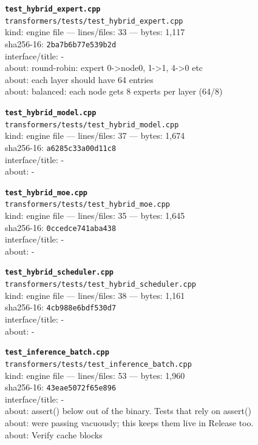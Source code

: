 \noindent\textbf{\texttt{test\_hybrid\_expert.cpp}}\\
\texttt{transformers/tests/test\_hybrid\_expert.cpp}\\
kind: engine file --- lines/files: 33 --- bytes: 1,117\\
sha256-16: \texttt{2ba7b6b77e539b2d}\\
interface/title: -\\
about: round-robin: expert 0->node0, 1->1, 4->0 etc\\
about: each layer should have 64 entries\\
about: balanced: each node gets 8 experts per layer (64/8)\\
\vspace*{6.0pt}
\newpage

\noindent\textbf{\texttt{test\_hybrid\_model.cpp}}\\
\texttt{transformers/tests/test\_hybrid\_model.cpp}\\
kind: engine file --- lines/files: 37 --- bytes: 1,674\\
sha256-16: \texttt{a6285c33a00d11c8}\\
interface/title: -\\
about: -\\
\vspace*{6.0pt}

\noindent\textbf{\texttt{test\_hybrid\_moe.cpp}}\\
\texttt{transformers/tests/test\_hybrid\_moe.cpp}\\
kind: engine file --- lines/files: 35 --- bytes: 1,645\\
sha256-16: \texttt{0ccedce741aba438}\\
interface/title: -\\
about: -\\
\vspace*{6.0pt}

\noindent\textbf{\texttt{test\_hybrid\_scheduler.cpp}}\\
\texttt{transformers/tests/test\_hybrid\_scheduler.cpp}\\
kind: engine file --- lines/files: 38 --- bytes: 1,161\\
sha256-16: \texttt{4cb988e6bdf530d7}\\
interface/title: -\\
about: -\\
\vspace*{6.0pt}

\noindent\textbf{\texttt{test\_inference\_batch.cpp}}\\
\texttt{transformers/tests/test\_inference\_batch.cpp}\\
kind: engine file --- lines/files: 53 --- bytes: 1,960\\
sha256-16: \texttt{43eae5072f65e896}\\
interface/title: -\\
about: assert() below out of the binary. Tests that rely on assert()\\
about: were passing vacuously; this keeps them live in Release too.\\
about: Verify cache blocks\\
\vspace*{6.0pt}
\newpage

